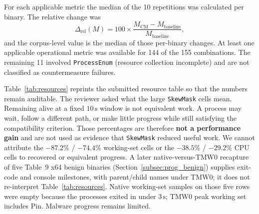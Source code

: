 \documentclass[pdflatex,sn-mathphys-num]{sn-jnl}
\theoremstyle{thmstyleone}
\theoremstyle{thmstyletwo}
\theoremstyle{thmstylethree}
\begin{document}
For each applicable metric the median of the 10 repetitions was calculated per binary. The relative change was
\begin{equation}
\Delta_{\mathrm{rel}}(M) = 100 \times \frac{M_{\mathrm{CM}} - M_{\mathrm{baseline}}}{M_{\mathrm{baseline}}},
\label{eq:rel}
\end{equation}
and the corpus-level value is the median of those per-binary changes. At least one applicable operational metric was available for 144 of the 155 combinations. The remaining 11 involved \texttt{ProcessEnum} (resource collection incomplete) and are not classified as countermeasure failures.

Table~\ref{tab:resources} reprints the submitted resource table so that the numbers remain auditable. The reviewer asked what the large \texttt{SkewMask} cells mean. Remaining alive at a fixed $10\,\mathrm{s}$ window is not equivalent work. A process may wait, follow a different path, or make little progress while still satisfying the compatibility criterion. Those percentages are therefore \textbf{not a performance gain} and are not used as evidence that \texttt{SkewMask} reduced useful work. We cannot attribute the $-87.2\%$ / $-74.4\%$ working-set cells or the $-38.5\%$ / $-29.2\%$ CPU cells to recovered or equivalent progress. A later native-versus-TMW0 recapture of five Table~9 x64 benign binaries (Section~\ref{subsec:prog_benign}) supplies exit-code and console milestones, with parent/child names under TMW0; it does not re-interpret Table~\ref{tab:resources}. Native working-set samples on those five rows were empty because the processes exited in under $3\,\mathrm{s}$; TMW0 peak working set includes Pin. Malware progress remains limited.
\end{document}
